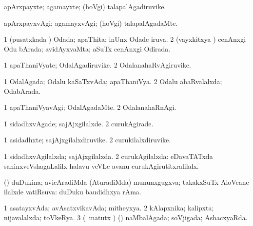 \bentry
{} 
\gl{\nA}
\expl{}
\bmng
apArxpayxte; agamayxte; (hoVgi) talapalAgadiruvike. 
\emng
\eentry

\bentry
{} 
\gl{\kirxvi}
\expl{}
\bmng
apArxpayxvAgi; agamayxvAgi; (hoVgi) talapalAgadaMte. 
\emng
\eentry

\bentry
{} 
\gl{\gu}
\expl{}
\bmng
\bnum
\num{1} (pusatxkada \vi) Odada; apaThita; inUnx Odade iruva. 
\num{2} (vayxkitxya \vi) cenAnxgi Odu bArada; avidAyxvaMta; aSuTx cenAnxgi Odirada. 
\enum
\emng
\eentry

\bentry
{} 
\gl{\nA}
\expl{}
\bmng
\bnum
\num{1} apaThaniVyate; OdalAgadiruvike. 
\num{2} OdalanahaRvAgiruvike. 
\enum
\emng
\eentry

\bentry
{} 
\gl{\gu}
\expl{}
\bmng
\bnum
\num{1} OdalAgada; Odalu kaSaTxvAda; apaThaniVya. 
\num{2} Odalu ahaRvalalxda; OdabArada. 
\enum
\emng
\eentry

\bentry
{} 
\gl{\kirxvi}
\expl{}
\bmng
\bnum
\num{1} apaThaniVyavAgi; OdalAgadaMte. 
\num{2} OdalanahaRnAgi. 
\enum
\emng
\eentry

\bentry
{} 
\gl{\kirxvi}
\expl{}
\bmng
\bnum
\num{1} sidadhxvAgade; sajAjxgilalxde. 
\num{2} curukAgirade. 
\enum
\emng
\eentry

\bentry
{} 
\gl{\nA}
\expl{}
\bmng
\bnum
\num{1} asidadhxte; sajAjxgilalxdiruvike. 
\num{2} curukilalxdiruvike. 
\enum
\emng
\eentry

\bentry
{} 
\gl{\gu}
\expl{}
\bmng
\bnum
\num{1} sidadhxvAgilalxda; sajAjxgilalxda. 
\num{2} curukAgilalxda:  eDavaTATxda saninxveVshagaLalilx halavu veVLe avanu curukAgirutitxralilalx. 
\enum
\emng
\eentry

\bentry
{} 
\gl{\gu}
\expl{}
\bmng
(\pArxparx) duDukina; avicAradiMda (AturadiMda) mununxgugxva; takakxSuTx AloVcane ilalxde vatiRsuva:  duDuku baudidhxya rAma. 
\emng
\eentry

\bentry
{} 
\gl{\gu}
\expl{}
\bmng
\bnum
\num{1} asatayxvAda; avAsatxvikavAda; mitheyxya. 
\num{2} kAlapxnika; kalipxta; nijavalalxda; toVkeRya. 
\num{3} (\ame\ matutx \AseTxrXV) (\ashi) naMbalAgada; soVjigada; AshacxyaRda. 
\enum
\emng
\eentry

